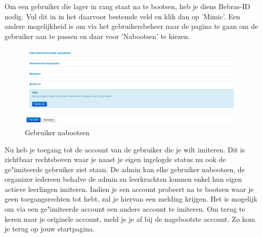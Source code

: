 \documentclass[]{article}
\begin{document}
Om een gebruiker die lager in rang staat na te bootsen, heb je diens Bebras-ID nodig. Vul dit in in het daarvoor bestemde veld en klik dan op 'Mimic'. Een andere mogelijkheid is om via het gebruikersbeheer naar de pagina te gaan om de gebruiker aan te passen en daar voor 'Nabootsen' te kiezen.

\begin{figure}[!ht]
	\centering
	\includegraphics[width=1\textwidth]{img/mimic_user}
	\caption{Gebruiker nabootsen}
	\label{mimic_user}
\end{figure}

Nu heb je toegang tot de account van de gebruiker die je wilt imiteren. Dit is zichtbaar rechtsboven waar je naast je eigen ingelogde status nu ook de ge"imiteerde gebruiker ziet staan. De admin kan elke gebruiker nabootsen, de organizer iedereen behalve de admin en leerkrachten kunnen enkel hun eigen actieve leerlingen imiteren. Indien je een account probeert na te bootsen waar je geen toegangsrechten tot hebt, zal je hiervan een melding krijgen. Het is mogelijk om via een ge"imiteerde account een andere account te imiteren. Om terug te keren naar je originele account, meld je je af bij de nagebootste account. Zo kom je terug op jouw startpagina. 
\end{document}
